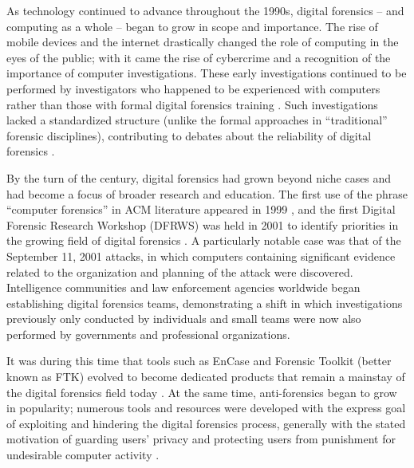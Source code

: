 \documentclass[letterpaper,12pt]{report}
\begin{document}
As technology continued to advance throughout the 1990s, digital
forensics -- and computing as a whole -- began to grow in scope and
importance. The rise of mobile devices and the internet drastically
changed the role of computing in the eyes of the public; with it came
the rise of cybercrime and a recognition of the importance of computer
investigations. These early investigations continued to be performed by
investigators who happened to be experienced with computers rather than
those with formal digital forensics training
\cite{hargreavesDigitalForensicsEducation2017}. Such investigations
lacked a standardized structure (unlike the formal approaches in
``traditional'' forensic disciplines), contributing to debates about the
reliability of digital forensics \cite{montasariRoadMapDigital2019}.

By the turn of the century, digital forensics had grown beyond niche
cases and had become a focus of broader research and education. The
first use of the phrase ``computer forensics'' in ACM literature
appeared in 1999 \cite{cooperStandardsDigitalForensics2010}, and the
first Digital Forensic Research Workshop (DFRWS) was held in 2001 to
identify priorities in the growing field of digital forensics
\cite{palmerRoadMapDigital2001}. A particularly notable case was
that of the September 11, 2001 attacks, in which computers containing
significant evidence related to the organization and planning of the
attack were discovered. Intelligence communities and law enforcement
agencies worldwide began establishing digital forensics teams,
demonstrating a shift in which investigations previously only conducted
by individuals and small teams were now also performed by governments
and professional organizations.

It was during this time that tools such as EnCase and Forensic Toolkit
(better known as FTK) evolved to become dedicated products that remain a
mainstay of the digital forensics field today
\cite{pollittHistoryDigitalForensics2010}. At the same time,
anti-forensics began to grow in popularity; numerous tools and resources
were developed with the express goal of exploiting and hindering the
digital forensics process, generally with the stated motivation of
guarding users' privacy and protecting users from punishment for
undesirable computer activity
\cite{geigerEvaluatingCommercialCounterForensic2005,harrisArrivingAntiforensicsConsensus2006}.
\end{document}
